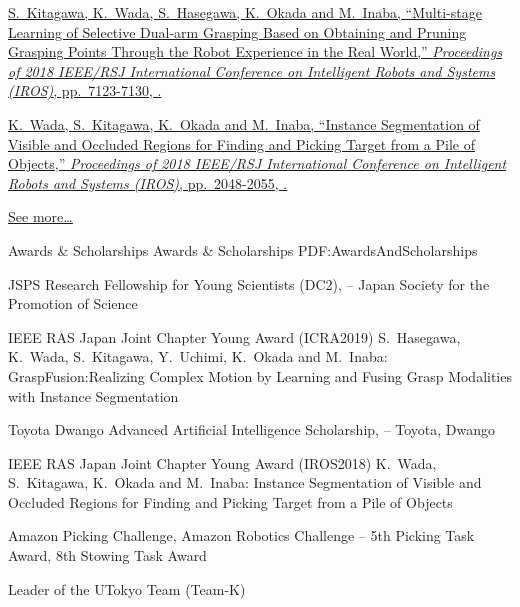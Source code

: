 \documentclass[letterpaper,MMMyyyy,nonstopmode]{simpleresumecv}
\begin{document}
\begin{Body}
\BulletItem
\href{https://doi.org/10.1109/IROS.2018.8593752}
{\underline{S.~Kitagawa}, K.~Wada, S.~Hasegawa, K.~Okada and M.~Inaba,
``Multi-stage Learning of Selective Dual-arm Grasping Based on Obtaining and Pruning Grasping Points Through the Robot Experience in the Real World,''
\textit{Proceedings of 2018 IEEE/RSJ International Conference on Intelligent Robots and Systems (IROS)},
pp.~7123-7130,
.}

\BulletItem
\href{https://doi.org/10.1109/IROS.2018.8593690}
{K.~Wada, \underline{S.~Kitagawa}, K.~Okada and M.~Inaba,
``Instance Segmentation of Visible and Occluded Regions for Finding and Picking Target from a Pile of Objects,''
\textit{Proceedings of 2018 IEEE/RSJ International Conference on Intelligent Robots and Systems (IROS)},
pp.~2048-2055,
.}

\hfill
\href{https://scholar.google.com/citations?user=deAeiIkAAAAJ}{\underline{See more…}}

\endgroup


\Section
{Awards \&\newline
Scholarships}
{Awards \& Scholarships}
{PDF:AwardsAndScholarships}

\BulletItem
JSPS Research Fellowship for Young Scientists (DC2),
\hfill
{} --
\newline
Japan Society for the Promotion of Science

 IEEE RAS Japan Joint Chapter Young Award (ICRA2019)
\hfill
{}
\newline
S.~Hasegawa, K.~Wada, S.~Kitagawa, Y.~Uchimi, K.~Okada and M.~Inaba:
GraspFusion:Realizing Complex Motion by Learning and Fusing Grasp Modalities with Instance Segmentation

\BulletItem
Toyota Dwango Advanced Artificial Intelligence Scholarship,
\hfill
{} --
\newline
Toyota, Dwango

 IEEE RAS Japan Joint Chapter Young Award (IROS2018)
\hfill
{}
\newline
K.~Wada, S.~Kitagawa, K.~Okada and M.~Inaba: Instance Segmentation of Visible and
Occluded Regions for Finding and Picking Target from a Pile of Objects

\BulletItem
Amazon Picking Challenge, Amazon Robotics Challenge
\hfill
{} --
\newline
5th Picking Task Award, 8th Stowing Task Award
\begin{Detail}
\Item
Leader of the UTokyo Team (Team-K)
\end{Detail}


\end{Body}
\end{document}
